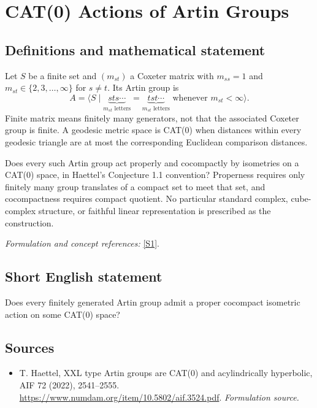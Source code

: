 \documentclass[11pt]{article}
\begin{document}
\section*{\texorpdfstring{CAT(0) Actions of Artin Groups}{CAT(0) Actions of Artin Groups}}\label{30002538}
\subsection{Definitions and mathematical statement}
Let $S$ be a finite set and $(m_{st})$ a Coxeter matrix with $m_{ss}=1$ and $m_{st}\in\{2,3,\ldots,\infty\}$ for $s\ne t$. Its Artin group is
\[
 A=\langle S\mid
 \underbrace{sts\cdots}_{m_{st}\text{ letters}}=
 \underbrace{tst\cdots}_{m_{st}\text{ letters}}
 \text{ whenever }m_{st}<\infty\rangle.
\]
Finite matrix means finitely many generators, not that the associated Coxeter group is finite. A geodesic metric space is CAT(0) when distances within every geodesic triangle are at most the corresponding Euclidean comparison distances.

Does every such Artin group act properly and cocompactly by isometries on a CAT(0) space, in Haettel's Conjecture 1.1 convention? Properness requires only finitely many group translates of a compact set to meet that set, and cocompactness requires compact quotient. No particular standard complex, cube-complex structure, or faithful linear representation is prescribed as the construction.
\par\smallskip\textit{Formulation and concept references:} \href{https://www.numdam.org/item/10.5802/aif.3524.pdf}{[S1]}.

\subsection{Short English statement}
Does every finitely generated Artin group admit a proper cocompact isometric action on some CAT(0) space?
\subsection{Sources}
\begin{itemize}
\item[S1]T. Haettel, XXL type Artin groups are CAT(0) and acylindrically hyperbolic, AIF 72 (2022), 2541–2555.
\url{https://www.numdam.org/item/10.5802/aif.3524.pdf}.
\textit{Formulation source.}
\end{itemize}
\end{document}
